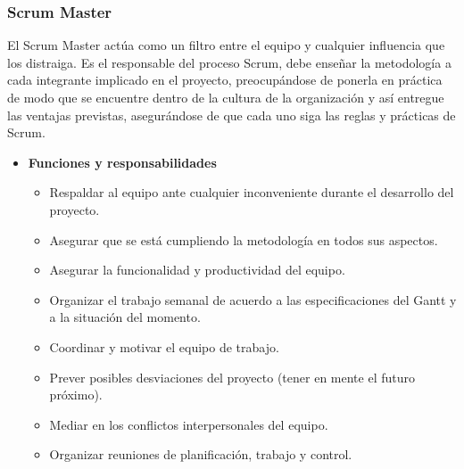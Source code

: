     
        \subsubsection{Scrum Master}
        El Scrum Master actúa como un filtro entre el equipo y cualquier influencia que los distraiga.
        Es el responsable del proceso Scrum, debe enseñar la metodología a cada integrante implicado en el proyecto, preocupándose de ponerla en práctica de modo que se encuentre dentro de la cultura de la organización y así entregue las ventajas previstas, asegurándose de que cada uno siga las reglas y prácticas de Scrum.
        	\begin{itemize}
			\item \textbf{Funciones y responsabilidades}
            	\begin{itemize}
				\item Respaldar al equipo ante cualquier inconveniente durante el desarrollo del proyecto.
                \item Asegurar que se está cumpliendo la metodología en todos sus aspectos.
                \item Asegurar la funcionalidad y productividad del equipo.
                \item Organizar el trabajo semanal de acuerdo a las especificaciones del Gantt y a la situación del momento.
                \item Coordinar y motivar el equipo de trabajo.
                \item Prever posibles desviaciones del proyecto (tener en mente el futuro próximo).
                \item Mediar en los conflictos interpersonales del equipo.
                \item Organizar reuniones de planificación, trabajo y control.
				\end{itemize}
             

\end{itemize}
